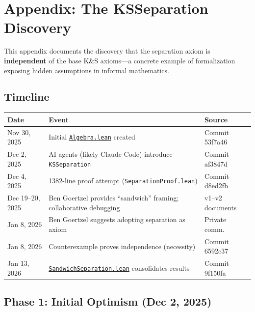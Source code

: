 \documentclass[11pt]{article}
\theoremstyle{definition}
\theoremstyle{remark}
\begin{document}
\section*{Appendix: The KSSeparation Discovery}
\label{app:separation-history}

This appendix documents the discovery that the separation axiom is \textbf{independent} of the
base K\&S axioms---a concrete example of formalization exposing hidden assumptions in informal
mathematics.

\subsection*{Timeline}

\begin{center}
\begin{tabular}{lll}
\toprule
\textbf{Date} & \textbf{Event} & \textbf{Source} \\
\midrule
Nov 30, 2025 & Initial \href{https://github.com/zariuq/ks-foundations-of-inference/blob/main/KnuthSkilling/Core/Algebra.lean}{\texttt{Algebra.lean}} created & Commit 53f7a46 \\
Dec 2, 2025 & AI agents (likely Claude Code) introduce \texttt{KSSeparation} & Commit af3847d \\
Dec 4, 2025 & 1382-line proof attempt (\texttt{SeparationProof.lean}) & Commit d8ed2fb \\
Dec 19--20, 2025 & Ben Goertzel provides ``sandwich'' framing; collaborative debugging & v1--v2 documents \\
Jan 8, 2026 & Ben Goertzel suggests adopting separation as axiom & Private comm. \\
Jan 8, 2026 & Counterexample proves independence (necessity) & Commit 6592c37 \\
Jan 13, 2026 & \href{https://github.com/zariuq/ks-foundations-of-inference/blob/main/KnuthSkilling/Additive/Axioms/SandwichSeparation.lean}{\texttt{SandwichSeparation.lean}} consolidates results & Commit 9f150fa \\
\bottomrule
\end{tabular}
\end{center}

\subsection*{Phase 1: Initial Optimism (Dec 2, 2025)}
\end{document}
